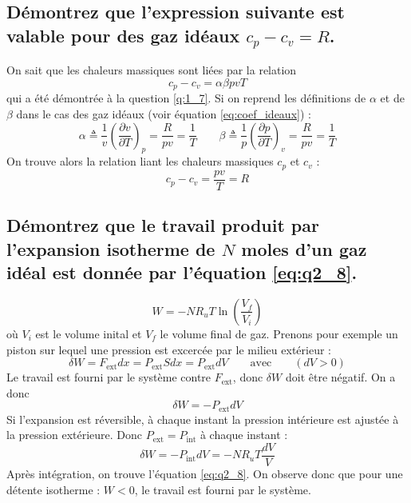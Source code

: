 \subsection{Démontrez que l'expression suivante est valable pour des gaz idéaux $c_p-c_v = R$.}
On sait que les chaleurs massiques sont liées par la relation 
\begin{equation} c_p-c_v = \alpha\beta pvT \end{equation}
qui a été démontrée à la question \ref{q:1_7}. Si on reprend les définitions de $\alpha$ et de $\beta$ dans le cas des gaz idéaux (voir équation \ref{eq:coef_ideaux}) : 
\begin{equation} \alpha \triangleq \frac{1}{v}\left(\frac{\partial v}{\partial T}\right)_p = \frac{R}{pv} = \frac{1}{T} \qquad \beta \triangleq \frac{1}{p}\left(\frac{\partial p}{\partial T}\right)_v = \frac{R}{pv} = \frac{1}{T} \end{equation}
On trouve alors la relation liant les chaleurs massiques $c_p$ et $c_v$ :
\begin{equation} c_p-c_v = \frac{pv}{T} = R \end{equation}

\subsection{Démontrez que le travail produit par l'expansion isotherme de $N$ moles d'un gaz idéal est donnée par l'équation \ref{eq:q2_8}.}
\begin{equation} W = -NR_uT\ln\left(\frac{V_f}{V_i}\right) \label{eq:q2_8}\end{equation}
où $V_i$ est le volume inital et $V_f$ le volume final de gaz.
Prenons pour exemple un piston sur lequel une pression est excercée par le milieu extérieur :
\begin{equation} \delta W = F_\text{ext}dx = P_\text{ext}Sdx = P_\text{ext}dV \qquad \text{avec} \qquad (dV>0)\end{equation} 
Le travail est fourni par le système contre $F_\text{ext}$, donc $\delta W$ doit être négatif. On a donc 
\begin{equation} \delta W = -P_\text{ext}dV \end{equation}
Si l'expansion est réversible, à chaque instant la pression intérieure est ajustée à la pression extérieure. Donc $P_\text{ext} = P_\text{int}$ à chaque instant :
\begin{equation} \delta W = -P_\text{int}dV = -NR_uT\frac{dV}{V} \end{equation}
Après intégration, on trouve l'équation \ref{eq:q2_8}. On observe donc que pour une détente isotherme : $W<0$, le travail est fourni par le système.

